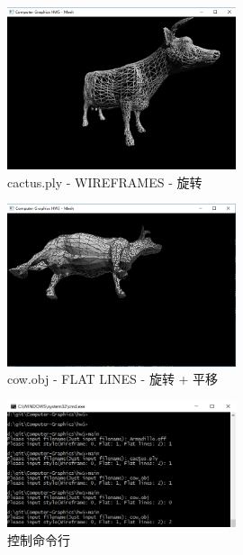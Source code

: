 \documentclass[hyperref, UTF8]{ctexart}
\begin{document}
	\begin{figure}[H]
		\centering
		\includegraphics[width=0.6\textwidth]{../results/cow_2.png}
		\caption{cactus.ply - WIREFRAMES - 旋转}
	\end{figure}
	\begin{figure}[H]
		\centering
		\includegraphics[width=0.6\textwidth]{../results/cow_3.png}
		\caption{cow.obj - FLAT LINES - 旋转 + 平移}
	\end{figure}
	\begin{figure}[H]
		\centering
		\includegraphics[width=0.6\textwidth]{../results/cl.png}
		\caption{控制命令行}
	\end{figure}
\end{document}
